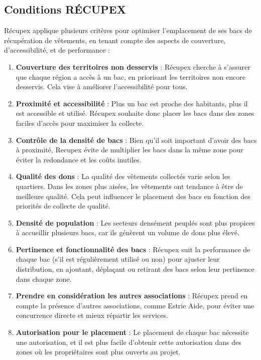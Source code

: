 \documentclass[11pt]{article}
\begin{document}
\subsection{Conditions RÉCUPEX}
Récupex applique plusieurs critères pour optimiser l’emplacement de ses bacs de récupération de vêtements, en tenant compte des aspects de couverture, d'accessibilité, et de performance :

\begin{enumerate}
    \item \textbf{Couverture des territoires non desservis} : Récupex cherche à s’assurer que chaque région a accès à un bac, en priorisant les territoires non encore desservis. Cela vise à améliorer l’accessibilité pour tous.

    \item \textbf{Proximité et accessibilité} : Plus un bac est proche des habitants, plus il est accessible et utilisé. Récupex souhaite donc placer les bacs dans des zones faciles d’accès pour maximiser la collecte.

    \item \textbf{Contrôle de la densité de bacs} : Bien qu’il soit important d’avoir des bacs à proximité, Recupex évite de multiplier les bacs dans la même zone pour éviter la redondance et les coûts inutiles.

    \item\textbf{Qualité des dons} : La qualité des vêtements collectés varie selon les quartiers. Dans les zones plus aisées, les vêtements ont tendance à être de meilleure qualité. Cela peut influencer le placement des bacs en fonction des priorités de collecte de qualité.

    \item\textbf{Densité de population} :  Les secteurs densément peuplés sont plus propices à accueillir plusieurs bacs, car ils génèrent un volume de dons plus élevé.

    \item\textbf{Pertinence et fonctionnalité des bacs} : Récupex suit la performance de chaque bac (s’il est régulièrement utilisé ou non) pour ajuster leur distribution, en ajoutant, déplaçant ou retirant des bacs selon leur pertinence dans chaque zone.

    \item\textbf{Prendre en considération les autres associations} :  Récupex prend en compte la présence d’autres associations, comme Estrie Aide, pour éviter une concurrence directe et mieux répartir les services.

    \item\textbf{Autorisation pour le placement} : Le placement de chaque bac nécessite une autorisation, et il est plus facile d’obtenir cette autorisation dans des zones où les propriétaires sont plus ouverts au projet.
\end{enumerate}
\end{document}
